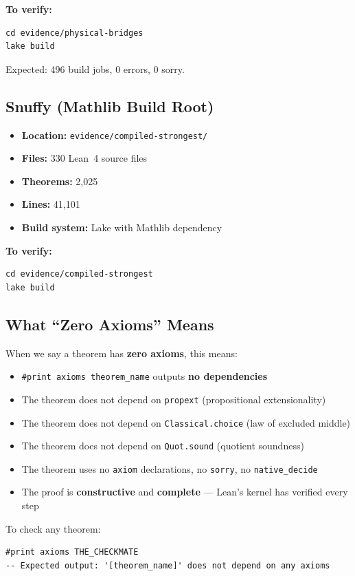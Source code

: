 \documentclass[11pt,a4paper]{article}
\newcommand{\lean}[1]{\texttt{#1}}
\newcommand{\file}[1]{\texttt{\small #1}}
\begin{document}
\noindent\textbf{To verify:}
\begin{lstlisting}
cd evidence/physical-bridges
lake build
\end{lstlisting}
Expected: 496 build jobs, 0 errors, 0 sorry.

\subsection{Snuffy (Mathlib Build Root)}

\begin{itemize}
\item \textbf{Location:} \file{evidence/compiled-strongest/}
\item \textbf{Files:} 330 Lean~4 source files
\item \textbf{Theorems:} 2,025
\item \textbf{Lines:} 41,101
\item \textbf{Build system:} Lake with Mathlib dependency
\end{itemize}

\noindent\textbf{To verify:}
\begin{lstlisting}
cd evidence/compiled-strongest
lake build
\end{lstlisting}

\subsection{What ``Zero Axioms'' Means}

When we say a theorem has \textbf{zero axioms}, this means:

\begin{itemize}
\item \lean{\#print axioms theorem\_name} outputs \textbf{no dependencies}
\item The theorem does not depend on \lean{propext} (propositional extensionality)
\item The theorem does not depend on \lean{Classical.choice} (law of excluded middle)
\item The theorem does not depend on \lean{Quot.sound} (quotient soundness)
\item The theorem uses no \lean{axiom} declarations, no \lean{sorry}, no \lean{native\_decide}
\item The proof is \textbf{constructive} and \textbf{complete} --- Lean's kernel has verified every step
\end{itemize}

\noindent To check any theorem:
\begin{lstlisting}
#print axioms THE_CHECKMATE
-- Expected output: '[theorem_name]' does not depend on any axioms
\end{lstlisting}
\end{document}
